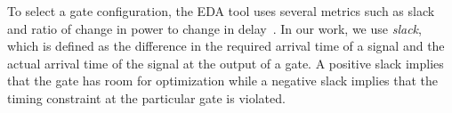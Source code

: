 To select a gate configuration, the EDA tool uses several metrics such as slack and ratio of change in power to change in delay~\cite{hu:12}. In our work, we use {\em slack}, which is defined as the difference in the required arrival time of a signal and the actual arrival time of the signal at the output of a gate. A positive slack implies that the gate has room for optimization while a negative slack implies that the timing constraint at the particular gate is violated. 


















